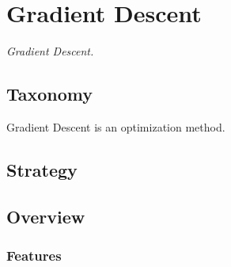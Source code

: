 
\section{Gradient Descent} 
\label{sec:gradient_descent}

\emph{Gradient Descent.}

\subsection{Taxonomy}
Gradient Descent is an optimization method.

\subsection{Strategy}


\subsection{Overview}

\subsubsection{Features}

